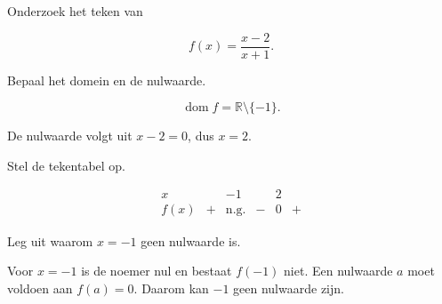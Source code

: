 \documentclass{ximera}
\begin{document}
\begin{oefening}{\oefB\ESS}

Onderzoek het teken van

\[
f(x)=\frac{x-2}{x+1}.
\]

\begin{question}
Bepaal het domein en de nulwaarde.

\begin{oplossing}
\[
\operatorname{dom}f=\mathbb{R}\setminus\{-1\}.
\]

De nulwaarde volgt uit \(x-2=0\), dus \(x=2\).
\end{oplossing}
\end{question}

\begin{question}
Stel de tekentabel op.

\begin{oplossing}
\[
\begin{array}{c|ccccc}
x &  & -1 &  & 2 & \\
\hline
f(x)&+&\text{n.g.}&-&0&+
\end{array}
\]
\end{oplossing}
\end{question}

\begin{question}
Leg uit waarom \(x=-1\) geen nulwaarde is.

\begin{oplossing}
Voor \(x=-1\) is de noemer nul en bestaat \(f(-1)\) niet.
Een nulwaarde \(a\) moet voldoen aan \(f(a)=0\).
Daarom kan \(-1\) geen nulwaarde zijn.
\end{oplossing}
\end{question}

\end{oefening}


\end{document}
